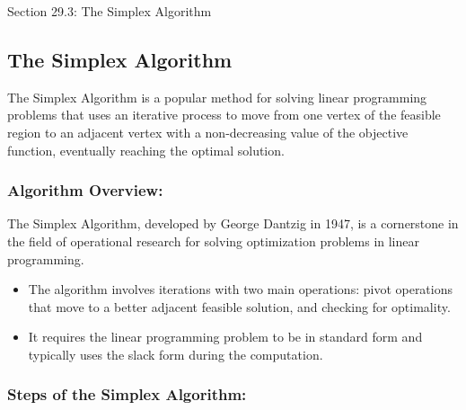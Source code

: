 \begin{notes}{Section 29.3: The Simplex Algorithm}
    \subsection*{The Simplex Algorithm}

    The Simplex Algorithm is a popular method for solving linear programming problems that uses an iterative process to move from one vertex of the feasible region to an adjacent vertex with a 
    non-decreasing value of the objective function, eventually reaching the optimal solution. \vspace*{1em}
    
    \subsubsection*{Algorithm Overview:}
    
    The Simplex Algorithm, developed by George Dantzig in 1947, is a cornerstone in the field of operational research for solving optimization problems in linear programming.
    
    \begin{itemize}
        \item The algorithm involves iterations with two main operations: pivot operations that move to a better adjacent feasible solution, and checking for optimality.
        \item It requires the linear programming problem to be in standard form and typically uses the slack form during the computation.
    \end{itemize}
    
    \subsubsection*{Steps of the Simplex Algorithm:}
    

\end{notes}
